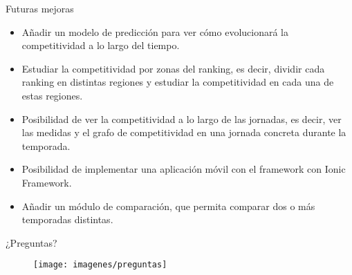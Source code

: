 \documentclass[10pt]{beamer}
\begin{document}
	\begin{frame}{Futuras mejoras}
		\begin{itemize}
			\item Añadir un modelo de predicción para ver cómo evolucionará la competitividad a lo largo del tiempo.
			
			\item Estudiar la competitividad por zonas del ranking, es decir, dividir cada ranking en distintas regiones y estudiar la competitividad en cada una de estas regiones. 
			
			\item Posibilidad de ver la competitividad a lo largo de las jornadas, es decir, ver las medidas y el grafo de competitividad en una jornada concreta durante la temporada.
			
			\item Posibilidad de implementar una aplicación móvil con el framework con Ionic Framework.
			
			\item Añadir un módulo de comparación, que permita comparar dos o más temporadas distintas.
			
		\end{itemize}
	\end{frame}
	
	
	\begin{frame}{¿Preguntas?}
		\begin{figure}
			\centering
			\texttt{[image: imagenes/preguntas]}
		\end{figure}

	\end{frame}
	
	
\end{document}
